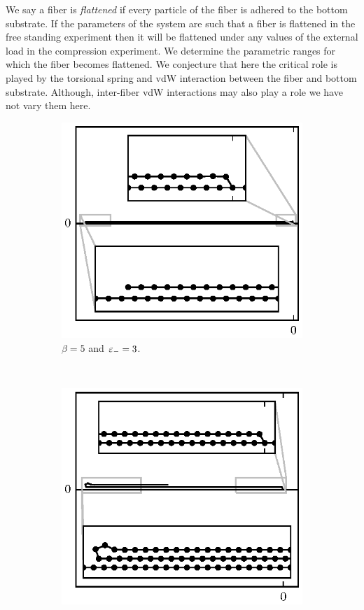 {We say a fiber is \textit{flattened} if every particle of the fiber is adhered to the bottom substrate. If the parameters of the system are such that a fiber is flattened in the free standing experiment then it will be flattened under any values of the external load in the compression experiment. We determine the parametric ranges for which the fiber becomes flattened. We conjecture that here the critical role is played by the torsional spring and vdW interaction between the fiber and bottom substrate. Although, inter-fiber vdW interactions may also play a role we have not vary them here.

	\begin{figure}[h!]
		\centering
		\begin{subfigure}{.5\textwidth}
			\centering
			\includegraphics{./fig/ch3/fs/b5_eb3.eps}
			\caption{$\beta=5$ and $\varepsilon_-=3$.\label{subfig:lazy}}
		\end{subfigure}%
		~
		\begin{subfigure}{.5\textwidth}
			\centering
			\includegraphics{./fig/ch3/fs/b2_eb6.eps}

\end{subfigure}
\end{figure}}
